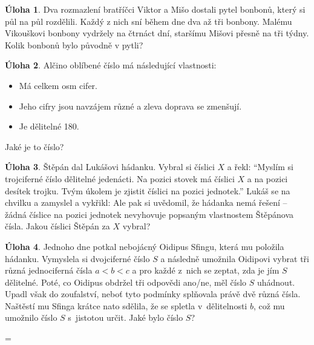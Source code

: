 \documentclass[12pt,a4paper]{article}
\theoremstyle{definition}
\newtheorem{uloha}{Úloha}
\def\vysld{}
\let\printvysl\relax
\let\printalphvysl\relax
\let\vysl\vyslplain
\begin{document}
\begin{uloha}
Dva rozmazlení bratříčci Viktor a Mišo dostali pytel bonbonů, který si půl na půl rozdělili. Každý z nich sní během dne dva až tři bonbony. Malému Vikouškovi bonbony vydržely na čtrnáct dní, staršímu Mišovi přesně na tři týdny. Kolik bonbonů bylo původně v pytli?
\vysl{84}
\end{uloha}


\begin{uloha}
Alčino oblíbené číslo má následující vlastnosti:
\begin{itemize}
\item Má celkem osm cifer.
\item Jeho cifry jsou navzájem různé a zleva doprava se zmenšují.
\item Je dělitelné 180.
\end{itemize}
Jaké je to číslo?
\vysl{97654320}
\end{uloha}


\begin{uloha}
Štěpán dal Lukášovi hádanku. Vybral si číslici $X$ a řekl: "`Myslím si trojciferné číslo dělitelné jedenácti. Na pozici stovek má číslici $X$ a na pozici desítek trojku. Tvým úkolem je zjistit číslici na pozici jednotek."' Lukáš se na chvilku a zamyslel a vykřikl:  Ale pak si uvědomil, že hádanka nemá řešení -- žádná číslice na pozici jednotek nevyhovuje popsaným vlastnostem Štěpánova čísla. Jakou číslici Štěpán za $X$ vybral?
\vysl{4}
\end{uloha}


\begin{uloha}
Jednoho dne potkal nebojácný Oidipus Sfingu, která mu položila hádanku. Vymyslela si dvojciferné číslo $S$ a následně umožnila Oidipovi vybrat tři různá jednociferná čísla $a<b<c$ a pro každé z~nich se zeptat, zda je jím $S$ dělitelné. Poté, co Oidipus obdržel tři odpovědi ano/ne, měl číslo $S$ uhádnout. Upadl však do zoufalství, neboť tyto podmínky splňovala právě dvě různá čísla. Naštěstí mu Sfinga krátce nato sdělila, že se spletla v~dělitelnosti $b$, což mu umožnilo číslo $S$ s~jistotou určit. Jaké bylo číslo $S$?
\vysl{84}
\end{uloha}


\newpage
\parindent=0pt
\parskip=\smallskipamount
\def\printvysl#1#2{\textbf{#1.}\ #2\par}
\def\printalphvysl#1#2#3{\textbf{#1}(#2)\ #3\par}
\vysld
\end{document}

